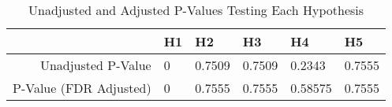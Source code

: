 \begin{table}[ht]
\centering
\caption{Unadjusted and Adjusted P-Values Testing Each Hypothesis} 
\begin{tabular}{rlllll}
  \hline
 & H1 & H2 & H3 & H4 & H5 \\ 
  \hline
Unadjusted P-Value & 0 & 0.7509 & 0.7509 & 0.2343 & 0.7555 \\ 
  P-Value (FDR Adjusted) & 0 & 0.7555 & 0.7555 & 0.58575 & 0.7555 \\ 
   \hline
\end{tabular}
\end{table}
